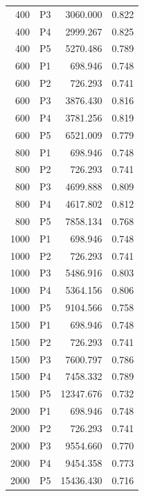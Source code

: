 \begin{table}[htbp]
\begin{tabular}{r l r r}
400 & P3 & 3060.000 & 0.822 \\
400 & P4 & 2999.267 & 0.825 \\
400 & P5 & 5270.486 & 0.789 \\
600 & P1 & 698.946 & 0.748 \\
600 & P2 & 726.293 & 0.741 \\
600 & P3 & 3876.430 & 0.816 \\
600 & P4 & 3781.256 & 0.819 \\
600 & P5 & 6521.009 & 0.779 \\
800 & P1 & 698.946 & 0.748 \\
800 & P2 & 726.293 & 0.741 \\
800 & P3 & 4699.888 & 0.809 \\
800 & P4 & 4617.802 & 0.812 \\
800 & P5 & 7858.134 & 0.768 \\
1000 & P1 & 698.946 & 0.748 \\
1000 & P2 & 726.293 & 0.741 \\
1000 & P3 & 5486.916 & 0.803 \\
1000 & P4 & 5364.156 & 0.806 \\
1000 & P5 & 9104.566 & 0.758 \\
1500 & P1 & 698.946 & 0.748 \\
1500 & P2 & 726.293 & 0.741 \\
1500 & P3 & 7600.797 & 0.786 \\
1500 & P4 & 7458.332 & 0.789 \\
1500 & P5 & 12347.676 & 0.732 \\
2000 & P1 & 698.946 & 0.748 \\
2000 & P2 & 726.293 & 0.741 \\
2000 & P3 & 9554.660 & 0.770 \\
2000 & P4 & 9454.358 & 0.773 \\
2000 & P5 & 15436.430 & 0.716 \\
\bottomrule
\end{tabular}
\end{table}
